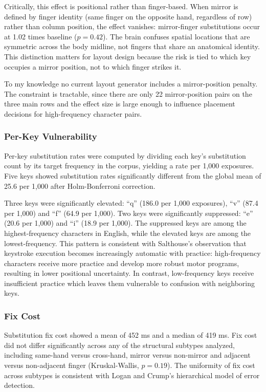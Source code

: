 \documentclass[12pt]{article}
\begin{document}
Critically, this effect is positional rather than finger-based. When mirror is defined by finger identity (same finger on the opposite hand, regardless of row) rather than column position, the effect vanishes: mirror-finger substitutions occur at 1.02 times baseline ($p = 0.42$). The brain confuses spatial locations that are symmetric across the body midline, not fingers that share an anatomical identity. This distinction matters for layout design because the risk is tied to which key occupies a mirror position, not to which finger strikes it.

To my knowledge no current layout generator includes a mirror-position penalty. The constraint is tractable, since there are only 22 mirror-position pairs on the three main rows and the effect size is large enough to influence placement decisions for high-frequency character pairs.

\subsubsection{Per-Key Vulnerability}

Per-key substitution rates were computed by dividing each key's substitution count by its target frequency in the corpus, yielding a rate per 1,000 exposures. Five keys showed substitution rates significantly different from the global mean of 25.6 per 1,000 after Holm-Bonferroni correction.

Three keys were significantly elevated: ``q'' (186.0 per 1,000 exposures), ``v'' (87.4 per 1,000) and ``f'' (64.9 per 1,000). Two keys were significantly suppressed: ``e'' (20.6 per 1,000) and ``i'' (18.9 per 1,000). The suppressed keys are among the highest-frequency characters in English, while the elevated keys are among the lowest-frequency. This pattern is consistent with Salthouse's \citep{salthouse1986} observation that keystroke execution becomes increasingly automatic with practice: high-frequency characters receive more practice and develop more robust motor programs, resulting in lower positional uncertainty. In contrast, low-frequency keys receive insufficient practice which leaves them vulnerable to confusion with neighboring keys.

\subsubsection{Fix Cost}

Substitution fix cost showed a mean of 452 ms and a median of 419 ms. Fix cost did not differ significantly across any of the structural subtypes analyzed, including same-hand versus cross-hand, mirror versus non-mirror and adjacent versus non-adjacent finger (Kruskal-Wallis, $p = 0.19$). The uniformity of fix cost across subtypes is consistent with Logan and Crump's \citep{logan2010} hierarchical model of error detection.
\end{document}
